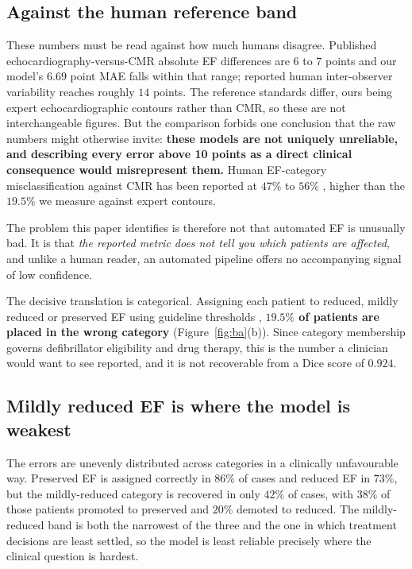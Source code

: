 \documentclass[conference,a4paper]{IEEEtran}
\begin{document}
\subsection{Against the human reference band}
These numbers must be read against how much humans disagree. Published
echocardiography-versus-CMR absolute EF differences are $6$ to $7$ points
\cite{thavendiranathan2013b} and our model's $6.69$ point MAE falls within that range;
reported human inter-observer variability reaches roughly $14$ points. The reference
standards differ, ours being expert echocardiographic contours rather than CMR, so these
are not interchangeable figures. But the comparison forbids one conclusion that the raw
numbers might otherwise invite: \textbf{these models are not uniquely unreliable, and
describing every error above 10 points as a direct clinical consequence would misrepresent them.}
Human EF-category misclassification
against CMR has been reported at $47\%$ to $56\%$ \cite{thavendiranathan2013b}, higher than
the $19.5\%$ we measure against expert contours.

The problem this paper identifies is therefore not that automated EF is unusually bad. It
is that \emph{the reported metric does not tell you which patients are affected}, and unlike a
human reader, an automated pipeline offers no accompanying signal of low confidence.

The decisive translation is categorical. Assigning each patient to reduced, mildly reduced
or preserved EF using guideline thresholds \cite{mcdonagh2021},
\textbf{$19.5\%$ of patients are placed in the wrong category}
(Figure~\ref{fig:ba}(b)). Since category membership governs defibrillator eligibility and
drug therapy, this is the number a clinician would want to see reported, and it is not
recoverable from a Dice score of $0.924$.

\subsection{Mildly reduced EF is where the model is weakest}
The errors are unevenly distributed across categories in a clinically unfavourable
way. Preserved EF is assigned correctly in $86\%$ of cases and reduced EF in $73\%$, but the
mildly-reduced category is recovered in only $42\%$ of cases, with $38\%$ of those patients
promoted to preserved and $20\%$ demoted to reduced. The mildly-reduced band is both the
narrowest of the three and the one in which treatment decisions are least settled, so the
model is least reliable precisely where the clinical question is hardest.
\end{document}
